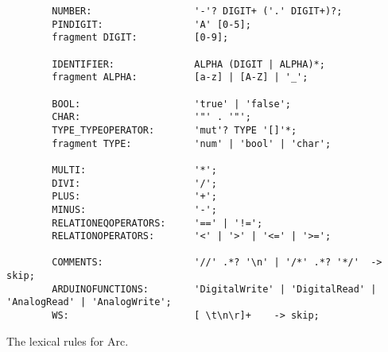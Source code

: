 \begin{listing}[htb!]
    \begin{verbatim}
        NUMBER:                  '-'? DIGIT+ ('.' DIGIT+)?;
        PINDIGIT:                'A' [0-5];
        fragment DIGIT:          [0-9];

        IDENTIFIER:              ALPHA (DIGIT | ALPHA)*;
        fragment ALPHA:          [a-z] | [A-Z] | '_';
        
        BOOL:                    'true' | 'false';
        CHAR:                    '"' . '"';
        TYPE_TYPEOPERATOR:       'mut'? TYPE '[]'*;
        fragment TYPE:           'num' | 'bool' | 'char';

        MULTI:                   '*';
        DIVI:                    '/';
        PLUS:                    '+';
        MINUS:                   '-';
        RELATIONEQOPERATORS:     '==' | '!=';
        RELATIONOPERATORS:       '<' | '>' | '<=' | '>=';

        COMMENTS:                '//' .*? '\n' | '/*' .*? '*/'  -> skip;
        ARDUINOFUNCTIONS:        'DigitalWrite' | 'DigitalRead' | 'AnalogRead' | 'AnalogWrite';
        WS:                      [ \t\n\r]+    -> skip;
    \end{verbatim}
    \caption{The lexical rules for Arc.}
    \label{lst:lexicalrules}
\end{listing}




